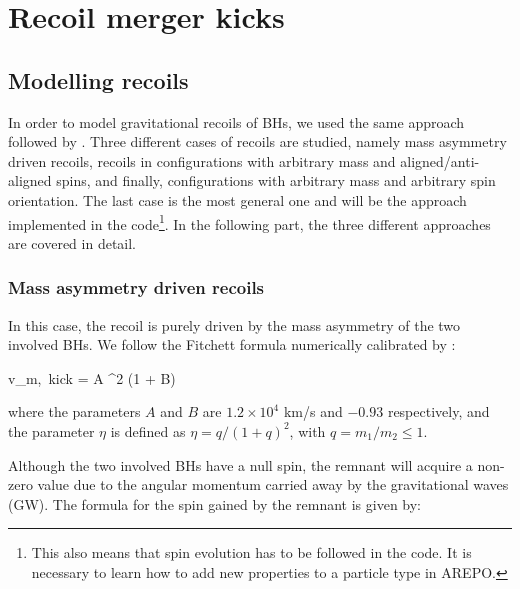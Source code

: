 \documentclass[a4,useAMS,usenatbib,usegraphicx,12pt]{article}
\begin{document}
\section{Recoil merger kicks}

\subsection{Modelling recoils}

In order to model gravitational recoils of BHs, we used the same approach followed by \citet{Sijacki2009}.
Three different cases of recoils are studied, namely mass asymmetry driven recoils, recoils in 
configurations with arbitrary mass and aligned/anti-aligned spins, and finally, configurations with
arbitrary mass and arbitrary spin orientation. The last case is the most general one and will be the 
approach implemented in the code\footnote{This also means that spin evolution has to be followed in 
the code. It is necessary to learn how to add new properties to a particle type in AREPO.}. In the
following part, the three different approaches are covered in detail.

\subsubsection{Mass asymmetry driven recoils}

In this case, the recoil is purely driven by the mass asymmetry of the two involved BHs. We follow
the Fitchett formula numerically calibrated by \citet{Gonzales2007}:

{v_{\mbox{\tiny{m, kick}}} = A \eta^2  (1 + B\eta)}

where the parameters $A$ and $B$ are $1.2\times 10^4$ km/s and $-0.93$ respectively, and the parameter
$\eta$ is defined as $\eta = q/(1+q)^2$, with $q = m_1/m_2\leq 1$.

Although the two involved BHs have a null spin, the remnant will acquire a non-zero value due to 
the angular momentum carried away by the gravitational waves (GW). The formula for the spin gained by
the remnant is given by:
\end{document}
